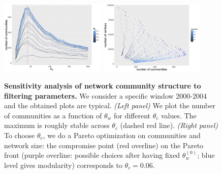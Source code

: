 \documentclass[12pt,twoside,a4paper]{article}
\begin{document}
\begin{figure}
\centering
\includegraphics[width=0.45\textwidth,height=0.25\textheight]{comnum_thetaw_2004.png}
\includegraphics[width=0.45\textwidth,height=0.25\textheight]{comnum_vcount_pareto_2004.png}
\caption{\textbf{Sensitivity analysis of network community structure to filtering parameters.} We consider a specific window 2000-2004 and the obtained plots are typical. \textit{(Left panel)} We plot the number of communities as a function of $\theta_w$ for different $\theta_c$ values. The maximum is roughly stable across $\theta_c$ (dashed red line). \textit{(Right panel)} To choose $\theta_c$, we do a Pareto optimization on communities and network size: the compromise point (red overline) on the Pareto front (purple overline: possible choices after having fixed $\theta_w^{(0)}$; blue level gives modularity) corresponds to $\theta_c = 0.06$.}
\label{fig:networksensitivity}
\end{figure}
\end{document}
